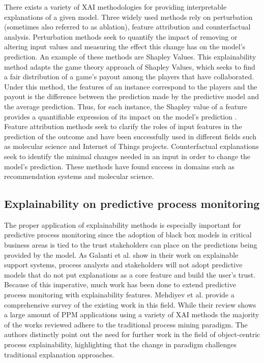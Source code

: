         There exists a variety of XAI methodologies for providing interpretable explanations of a given model. Three widely used methods rely on perturbation (sometimes also referred to as ablation), feature attribution and counterfactual analysis.
        Perturbation methods seek to quantify the impact of removing or altering input values and measuring the effect this change has on the model's prediction. An example of these methods are Shapley Values. This explainability method adapts the game theory approach of Shapley Values, which seeks to find a fair distribution of a game's payout among the players that have collaborated. Under this method, the features of an instance correspond to the players and the payout is the difference between the prediction made by the predictive model and the average prediction. Thus, for each instance, the Shapley value of a feature provides a quantifiable expression of its impact on the model's prediction \cite{lundberg2017}. 
        Feature attribution methods seek to clarify the roles of input features in the prediction of the outcome and have been successfully used in different fields such as molecular science and Internet of Things projects.
        Counterfactual explanations seek to identify the minimal changes needed in an input in order to change the model's prediction. These methods have found success in domains such as recommendation systems and molecular science.

        \subsection{Explainability on predictive process monitoring}
        The proper application of explainability methods is especially important for predictive process monitoring since the adoption of black box models in critical business areas is tied to the trust stakeholders can place on the predictions being provided by the model. As Galanti et al. \cite{galanti2023b} show in their work on explainable support systems, process analysts and stakeholders will not adopt predictive models that do not put explanations as a core feature and build the user's trust. Because of this imperative, much work has been done to extend predictive process monitoring with explainability features. Mehdiyev et al. \cite{mehdiyev2025} provide a comprehensive survey of the existing work in this field. While their review shows a large amount of PPM applications using a variety of XAI methods the majority of the works reviewed adhere to the traditional process mining paradigm. The authors distinctly point out the need for further work in the field of object-centric process explainability, highlighting that the change in paradigm challenges traditional explanation approaches. 
        
